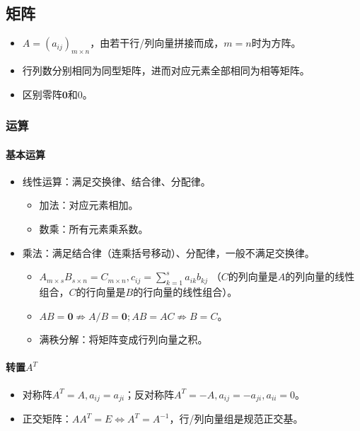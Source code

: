 \documentclass[
12pt, %
a4paper, 
oneside, %
headinclude,footinclude, %
]{scrartcl}
\begin{document}
\subsection{矩阵}
\begin{itemize}
\item $ A = (a_{ij})_{m \times n} $，由若干行/列向量拼接而成，$ m = n $时为方阵。
\item 行列数分别相同为同型矩阵，进而对应元素全部相同为相等矩阵。
\item 区别零阵$ \mathbf{0} $和$ 0 $。
\end{itemize}
\subsubsection{运算}
\paragraph{基本运算}
\begin{itemize}
\item 线性运算：满足交换律、结合律、分配律。
\begin{itemize}
\item 加法：对应元素相加。
\item 数乘：所有元素乘系数。
\end{itemize}
\item 乘法：满足结合律（连乘括号移动）、分配律，一般不满足交换律。
\begin{itemize}
\item $ A_{m \times s}B_{s \times n} = C_{m \times n}, c_{ij} = \sum_{k = 1}^s a_{ik}b_{kj} $
（$ C $的列向量是$ A $的列向量的线性组合，$ C $的行向量是$ B $的行向量的线性组合）。
\item $ AB = \mathbf{0} \nRightarrow A/B = \mathbf{0}; AB = AC \nRightarrow B = C $。
\item 满秩分解：将矩阵变成行列向量之积。
\end{itemize}
\end{itemize}
\paragraph{转置$ A^T $}
\begin{itemize}
\item 对称阵$ A^T = A, a_{ij} = a_{ji} $；反对称阵$ A^T = -A, a_{ij} = -a_{ji}, a_{ii} = 0 $。
\item 正交矩阵：$ AA^T = E \Leftrightarrow A^T = A^{-1} $，行/列向量组是规范正交基。
\end{itemize}
\end{document}
